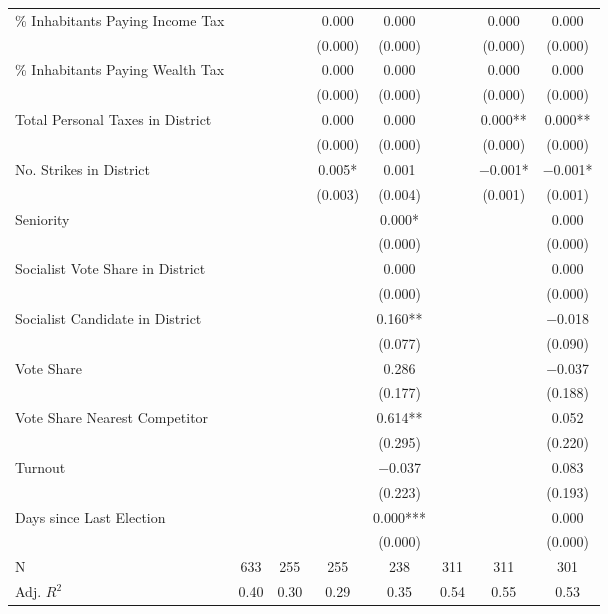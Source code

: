 \begin{table}[!h]
{\begin{threeparttable}
\begin{tabular}[t]{lccccccc}
\% Inhabitants Paying Income Tax &  &  & \num{0.000} & \num{0.000} &  & \num{0.000} & \num{0.000}\\
 &  &  & (\num{0.000}) & (\num{0.000}) &  & (\num{0.000}) & \vphantom{2} (\num{0.000})\\
\% Inhabitants Paying Wealth Tax &  &  & \num{0.000} & \num{0.000} &  & \num{0.000} & \num{0.000}\\
 &  &  & (\num{0.000}) & (\num{0.000}) &  & (\num{0.000}) & \vphantom{1} (\num{0.000})\\
Total Personal Taxes in District &  &  & \num{0.000} & \num{0.000} &  & \num{0.000}** & \num{0.000}**\\
 &  &  & (\num{0.000}) & (\num{0.000}) &  & (\num{0.000}) & (\num{0.000})\\
No. Strikes in District &  &  & \num{0.005}* & \num{0.001} &  & \num{-0.001}* & \num{-0.001}*\\
 &  &  & (\num{0.003}) & (\num{0.004}) &  & (\num{0.001}) & (\num{0.001})\\
Seniority &  &  &  & \num{0.000}* &  &  & \num{0.000}\\
 &  &  &  & (\num{0.000}) &  &  & \vphantom{2} (\num{0.000})\\
Socialist Vote Share in District &  &  &  & \num{0.000} &  &  & \num{0.000}\\
 &  &  &  & (\num{0.000}) &  &  & \vphantom{1} (\num{0.000})\\
Socialist Candidate in District &  &  &  & \num{0.160}** &  &  & \num{-0.018}\\
 &  &  &  & (\num{0.077}) &  &  & (\num{0.090})\\
Vote Share &  &  &  & \num{0.286} &  &  & \num{-0.037}\\
 &  &  &  & (\num{0.177}) &  &  & (\num{0.188})\\
Vote Share Nearest Competitor &  &  &  & \num{0.614}** &  &  & \num{0.052}\\
 &  &  &  & (\num{0.295}) &  &  & (\num{0.220})\\
Turnout &  &  &  & \num{-0.037} &  &  & \num{0.083}\\
 &  &  &  & (\num{0.223}) &  &  & (\num{0.193})\\
Days since Last Election &  &  &  & \num{0.000}*** &  &  & \num{0.000}\\
 &  &  &  & (\num{0.000}) &  &  & (\num{0.000})\\
\midrule
N & \num{633} & \num{255} & \num{255} & \num{238} & \num{311} & \num{311} & \num{301}\\
Adj. $R^2$ & \num{0.40} & \num{0.30} & \num{0.29} & \num{0.35} & \num{0.54} & \num{0.55} & \num{0.53}\\

\end{tabular}
\end{threeparttable}}
\end{table}
